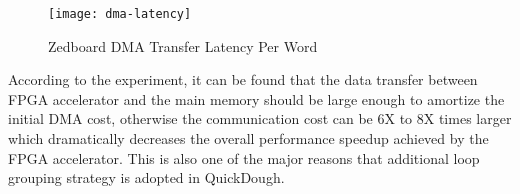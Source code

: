 \begin{figure}[htb]
    \centering
    \texttt{[image: dma-latency]}
    \caption{Zedboard DMA Transfer Latency Per Word}
    \label{fig:dma-latency}
\end{figure}

According to the experiment, it can be found that the data transfer between FPGA accelerator and the main memory should be large enough to amortize the initial DMA cost, otherwise the communication cost can be 6X to 8X times larger which dramatically decreases the overall performance speedup achieved by the FPGA accelerator. This is also one of the major reasons that additional loop grouping strategy is adopted in QuickDough. 

